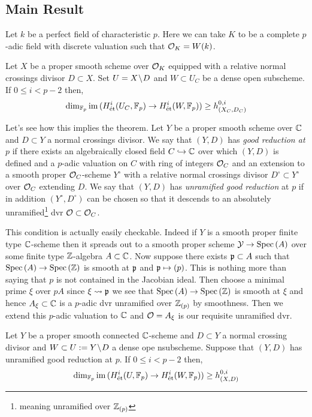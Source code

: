 \documentclass[12pt]{article}
\begin{document}
\subsection{Main Result}

Let $k$ be a perfect field of characteristic $p$. Here we can take $K$ to be a complete $p$-adic field with discrete valuation such that $\mathcal{O}_K = W(k)$. 

\begin{prop} \label{main_prop}
Let $X$ be a proper smooth scheme over $\mathcal{O}_K$ equipped with a relative normal crossings divisor $D \subset X$. Set $U = X \! \setminus \! D$ and $W \subset U_C$ be a dense open subscheme. If $0 \le i < p -2$ then,
\[ \dim_{\mathbb{F}_p} \operatorname{\mathrm{im}}{(H^i_{\text{\'{e}t}}(U_C, \mathbb{F}_p) \to H^i_{\text{\'{e}t}}(W, \mathbb{F}_p))} \ge h^{0,i}_{(X_C, D_C)} \]
\end{prop}
\bigskip
Let's see how this implies the theorem. Let $Y$ be a proper smooth scheme over $\mathbb{C}$ and $D \subset Y$ a normal crossings divisor. We say that $(Y, D)$ has \textit{good reduction at} $p$ if there exists an algebraically closed field $C \hookrightarrow \mathbb{C}$ over which $(Y, D)$ is defined and a $p$-adic valuation on $C$ with ring of integers $\mathcal{O}_C$ and an extension to a smooth proper $\mathcal{O}_C$-scheme $Y^\circ$ with a relative normal crossings divisor $D^\circ \subset Y^\circ$ over $\mathcal{O}_C$ extending $D$. We say that $(Y, D)$ has \textit{unramified good reduction} at $p$ if in addition $(Y^\circ, D^\circ)$ can be chosen so that it descends to an absolutely unramified\footnote{meaning unramified over $\mathbb{Z}_{(p)}$} dvr $\mathcal{O} \subset \mathcal{O}_C$. 

\begin{rmk}
This condition is actually easily checkable. Indeed if $Y$ is a smooth proper finite type $\mathbb{C}$-scheme then it spreads out to a smooth proper scheme $\mathcal{Y} \to \mathrm{Spec}\left( A \right)$ over some finite type $\mathbb{Z}$-algebra $A \subset \mathbb{C}$. Now suppose there exists $\mathfrak{p} \subset A$ such that $\mathrm{Spec}\left( A \right) \to \mathrm{Spec}\left( \mathbb{Z} \right)$ is smooth at $\mathfrak{p}$ and $\mathfrak{p} \mapsto (p)$. This is nothing more than saying that $p$ is not contained in the Jacobian ideal. Then choose a minimal prime $\xi$ over $p A$ since $\xi \rightsquigarrow \mathfrak{p}$ we see that $\mathrm{Spec}\left( A \right) \to \mathrm{Spec}\left( \mathbb{Z} \right)$ is smooth at $\xi$ and hence $A_{\xi} \subset \mathbb{C}$ is a $p$-adic dvr unramified over $\mathbb{Z}_{(p)}$ by smoothness. Then we extend this $p$-adic valuation to $\mathbb{C}$ and $\mathcal{O} = A_{\xi}$ is our requisite unramified dvr. 
\end{rmk}

\begin{cor}
Let $Y$ be a proper smooth connected $\mathbb{C}$-scheme and $D \subset Y$ a normal crossing divisor and $W \subset U := Y \! \setminus \! D$ a dense ope nsubscheme. Suppose that $(Y, D)$ has unramified good reduction at $p$. If $0 \le i < p - 2$ then,
\[ \dim_{\mathbb{F}_p} \operatorname{\mathrm{im}}{(H^i_{\text{\'{e}t}}(U, \mathbb{F}_p) \to H^i_{\text{\'{e}t}}(W, \mathbb{F}_p))} \ge h^{0,i}_{(X, D)} \]
\end{cor}
\end{document}
